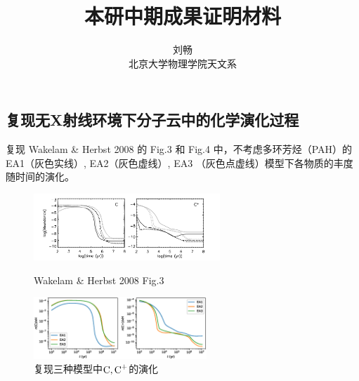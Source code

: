 \documentclass[UTF8]{article}
\begin{document}
	\title{\heiti 本研中期成果证明材料}
	\author{\songti 刘畅\\北京大学物理学院天文系}
	\date{}
	\maketitle
\begin{fangsong}
\section{复现无X射线环境下分子云中的化学演化过程}
复现 Wakelam \& Herbst 2008 的 Fig.3 和 Fig.4 中，不考虑多环芳烃（PAH）的 EA1（灰色实线）, EA2（灰色虚线）, EA3 （灰色点虚线）模型下各物质的丰度随时间的演化。
\begin{figure}[htbp]
	\centering
	\begin{minipage}[t]{0.50\textwidth}
		\centering
		\includegraphics[width=7cm]{Wakelam1.png}
		\caption{Wakelam \& Herbst 2008 Fig.3}
	\end{minipage}
	\begin{minipage}[t]{0.49\textwidth}
		\centering
		\includegraphics[width=6.5cm]{1.eps}
		\caption{复现三种模型中$\ce{C,C+}$的演化}
	\end{minipage}
\end{figure}


\end{fangsong}
\end{document}
